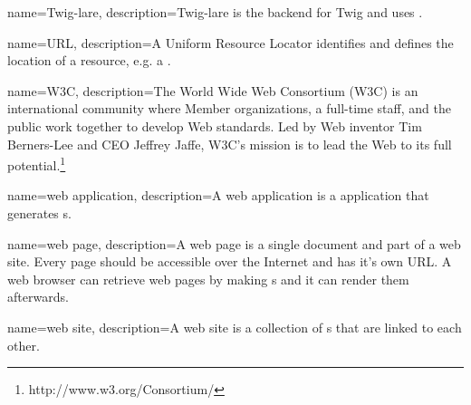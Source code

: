 {
  name=Twig-lare,
  description={Twig-lare is the \lare{} backend for Twig and uses \phpLare{}.}
}

{
  name=URL,
  description={A Uniform Resource Locator identifies and defines the location of a resource, e.g. a \webPage{}.}
}

{
  name=W3C,
  description={The World Wide Web Consortium (W3C) is an international community where Member organizations, a full-time staff, and the public work together to develop Web standards. Led by Web inventor Tim Berners-Lee and CEO Jeffrey Jaffe, W3C's mission is to lead the Web to its full potential.\footnote{http://www.w3.org/Consortium/}}
}

{
  name=web application,
  description={A web application is a application that generates \webPage{}s.}
}

{
  name=web page,
  description={A web page is a single document and part of a web site. 
  Every page should be accessible over the Internet and has it's own URL.
  A web browser can retrieve web pages by making \httpRequest{}s and it can render them afterwards.}
}

{
  name=web site,
  description={A web site is a collection of \webPage{}s that are linked to each other.}
}

